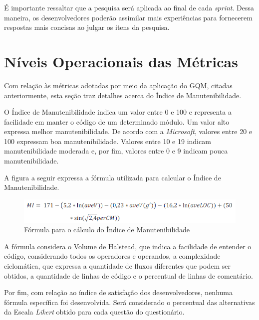 É importante ressaltar que a pesquisa será aplicada ao final de cada \textit{sprint}. Dessa maneira, os desenvolvedores poderão assimilar mais experiências para fornecerem respostas mais concisas ao julgar os itens da pesquisa.

\section{Níveis Operacionais das Métricas}

Com relação às métricas adotadas por meio da aplicação do GQM, citadas anteriormente, esta seção traz detalhes acerca do Índice de Manutenibilidade.

O Índice de Manutenibilidade indica um valor entre 0 e 100 e representa a facilidade em manter o código de um determinado módulo. Um valor alto expressa melhor manutenibilidade. De acordo com a \textit{Microsoft}, valores entre 20 e 100 expressam boa manutenibilidade. Valores entre 10 e 19 indicam manutenibilidade moderada e, por fim, valores entre 0 e 9 indicam pouca manutenibilidade.

A figura a seguir expressa a fórmula utilizada para calcular o Índice de Manutenibilidade.

\begin{figure}[h]
\includegraphics[width=\textwidth]{figuras/mi.png}
\caption{Fórmula para o cálculo do Índice de Manutenibilidade}
\end{figure}

A fórmula considera o Volume de Halstead, que indica a facilidade de entender o código, considerando todos os operadores e operandos, a complexidade ciclomática, que expressa a quantidade de fluxos diferentes que podem ser obtidos, a quantidade de linhas de código e o percentual de linhas de comentário.

Por fim, com relação ao índice de satisfação dos desenvolvedores, nenhuma fórmula específica foi desenvolvida. Será considerado o percentual das alternativas da Escala \textit{Likert} obtido para cada questão do questionário.